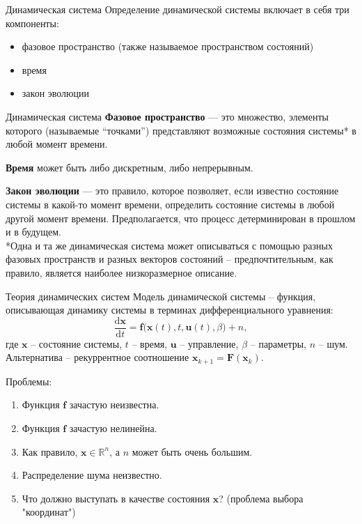 \begin{frame}{Динамическая система}
Определение динамической системы включает в себя три компоненты:
\begin{itemize}
    \item фазовое пространство (также называемое пространством состояний)
    \item время
    \item закон эволюции
\end{itemize}

\begin{figure}
    \centering
\end{figure}

\end{frame}
\begin{frame}{Динамическая система}
\textbf{Фазовое пространство} --- это множество, элементы которого (называемые “точками”) представляют возможные состояния системы* в любой момент времени.

\vspace{0.5cm}
\textbf{Время} может быть либо дискретным, либо непрерывным.

\vspace{0.5cm}
\textbf{Закон эволюции} --- это правило, которое позволяет, если известно состояние системы в какой-то момент времени, определить состояние системы в любой другой момент времени. Предполагается, что процесс детерминирован в прошлом и в будущем. \\
\vspace{0.5cm}
*Одна и та же динамическая система может описываться с помощью разных фазовых пространств и разных векторов состояний -- предпочтительным, как правило, является наиболее низкоразмерное описание.

\end{frame}
\begin{frame}{Теория динамических систем}
Модель динамической системы -- функция, описывающая динамику системы в терминах дифференциального уравнения:
$$ \frac{\text{d}\mathbf{x}}{\text{d}t} = \mathbf{f}\Big(\mathbf{x}(t), t, \mathbf{u}(t), \beta \Big) + n, $$
где $\mathbf{x}$ -- состояние системы, $t$ -- время, $\mathbf{u}$ -- управление, $\beta$ -- параметры, $n$ -- шум. \\
Альтернатива -- рекуррентное соотношение $\mathbf{x}_{k+1} = \mathbf{F}
(\mathbf{x}_k)$.

Проблемы:
\begin{enumerate}
    \item Функция $\mathbf{f}$ зачастую неизвестна.
    \item Функция $\mathbf{f}$ зачастую нелинейна.
    \item Как правило, $\mathbf{x} \in \mathbb{R}^n$, а $n$ может быть очень большим.
    \item Распределение шума неизвестно.
    \item Что должно выступать в качестве состояния $\mathbf{x}$? (проблема выбора "координат")
\end{enumerate}
\end{frame}
